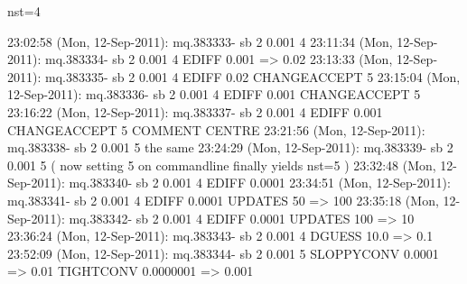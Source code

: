 
nst=4

23:02:58 (Mon, 12-Sep-2011):
	mq.383333- sb 2 0.001 4
23:11:34 (Mon, 12-Sep-2011):
	mq.383334- sb 2 0.001 4  
							EDIFF 0.001 => 0.02
23:13:33 (Mon, 12-Sep-2011):
	mq.383335- sb 2 0.001 4  
							EDIFF 0.02
							CHANGEACCEPT 5
23:15:04 (Mon, 12-Sep-2011):
	mq.383336- sb 2 0.001 4  
							EDIFF 0.001
							CHANGEACCEPT 5
23:16:22 (Mon, 12-Sep-2011):
	mq.383337- sb 2 0.001 4  
							EDIFF 0.001
							CHANGEACCEPT 5
							COMMENT CENTRE
23:21:56 (Mon, 12-Sep-2011):
	mq.383338- sb 2 0.001 5  
							the same
23:24:29 (Mon, 12-Sep-2011):
	mq.383339- sb 2 0.001 5  
							( now setting 5 on commandline finally yields nst=5 )
23:32:48 (Mon, 12-Sep-2011):
	mq.383340- sb 2 0.001 4  
							EDIFF 0.0001
23:34:51 (Mon, 12-Sep-2011):
	mq.383341- sb 2 0.001 4  
							EDIFF 0.0001
							UPDATES 50 => 100
23:35:18 (Mon, 12-Sep-2011):
	mq.383342- sb 2 0.001 4  
							EDIFF 0.0001
							UPDATES 100 => 10
23:36:24 (Mon, 12-Sep-2011):
	mq.383343- sb 2 0.001 4  
							DGUESS 10.0 => 0.1 
23:52:09 (Mon, 12-Sep-2011):
	mq.383344- sb 2 0.001 5
							SLOPPYCONV 0.0001 => 0.01
							TIGHTCONV  0.0000001 => 0.001

